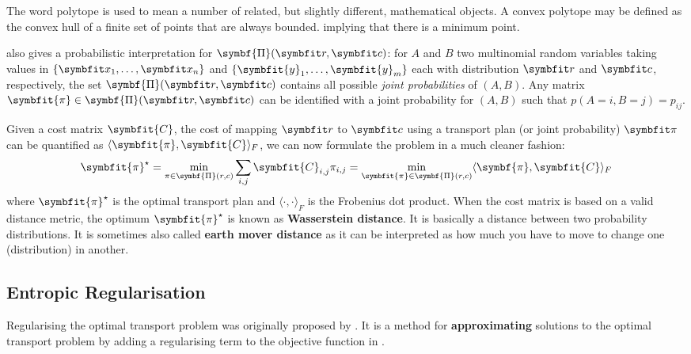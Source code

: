 \begin{tcolorbox}[title=Polytope]
The word polytope is used to mean a number of related, but slightly different, mathematical objects. A convex polytope may be defined as the convex hull of a finite set of points that are always bounded.  implying that there is a minimum point.
\end{tcolorbox}

\textcite{cuturi2013sinkhorn} also gives a probabilistic interpretation for $\symbf{\Pi}(\bfitr, \bfitc)$: for $A$ and $B$ two multinomial random variables taking values in  $\{\bfitx_1, \ldots, \bfitx_n\}$ and  $\{\symbfit{y}_1, \ldots, \symbfit{y}_m\}$ each with distribution $\bfitr$ and $\bfitc$, respectively, the set $\symbf{\Pi}(\bfitr, \bfitc)$ contains all possible \textit{joint probabilities} of $(A, B)$. Any matrix $\symbfit{\pi} \in \symbf{\Pi}(\bfitr, \bfitc)$ can be identified with a joint probability for $(A, B)$ such that $p(A = i, B = j) = p_{ij}$.

Given a cost matrix $\symbfit{C}$, the cost of mapping $\bfitr$ to $\bfitc$ using a transport plan (or joint probability) $\symbfit \pi$ can be quantified as $\langle \symbfit{\pi}, \symbfit{C} \rangle_{F}$, we can now formulate the problem in a much cleaner fashion:
\begin{equation}
    \symbfit{\pi}^\star = \min_{\pi \in \symbf{\Pi}(r, c)} \sum_{i,j} \symbfit{C}_{i,j}{\pi}_{i,j} = \min_{\symbfit{\pi} \in \symbf{\Pi}(r, c)} \langle \symbf{\pi}, \symbfit{C} \rangle_{F}
    \label{eqn:ot-objective-relaxed}
\end{equation}
where $\symbfit{\pi}^\star$ is the optimal transport plan and $\langle \cdot, \cdot \rangle_{F}$ is the Frobenius dot product. When the cost matrix is based on a valid distance metric, the optimum $\symbfit{\pi}^\star$ is known as \textbf{Wasserstein distance}. It is basically a distance between two probability distributions. It is sometimes also called \textbf{earth mover distance} as it can be interpreted as how much  you have to move to change one  (distribution) in another.

\subsection{Entropic Regularisation}\label{ssec:ot-entropic-reg}

Regularising the optimal transport problem was originally proposed by \textcite{hitchcock1941distribution}. It is a method for \textbf{approximating} solutions to the optimal transport problem by adding a regularising term to the objective function in .

